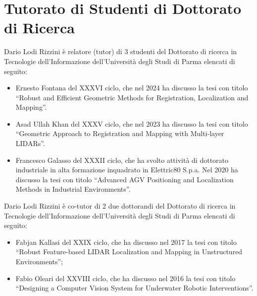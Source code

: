 \documentclass[11pt]{article}
\begin{document}
\section*{Tutorato di Studenti di Dottorato di Ricerca}

Dario Lodi Rizzini \`e relatore (tutor) di 3 studenti del Dottorato di ricerca in Tecnologie dell'Informazione dell'Universit\`a degli Studi di Parma elencati di seguito:
\begin{itemize}
\item Ernesto Fontana del XXXVI ciclo, che nel 2024 ha discusso la tesi con titolo ``Robust and Efficient Geometric Methods for Registration, Localization and Mapping''.
\item Asad Ullah Khan del XXXV ciclo, che nel 2023 ha discusso la tesi con titolo ``Geometric Approach to Registration and Mapping with Multi-layer LIDARs''.
\item Francesco Galasso del XXXII ciclo, che ha svolto attivit\`a di dottorato industriale in alta formazione inquadrato in Elettric80 S.p.a. 
  Nel 2020 ha discusso la tesi con titolo ``Advanced AGV Positioning and Localization Methods in Industrial Environments''.
\end{itemize}
%
\vspace{3mm}
%
Dario Lodi Rizzini \`e co-tutor di 2 due dottorandi del Dottorato di ricerca in Tecnologie dell'Informazione dell'Universit\`a degli Studi di Parma elencati di seguito:
\begin{itemize}
\item Fabjan Kallasi del XXIX ciclo, che ha discusso nel 2017 la tesi con titolo ``Robust Feature-based LIDAR Localization and Mapping in Unstructured Environments'';
\item Fabio Oleari del XXVIII ciclo, che ha discusso nel 2016 la tesi con titolo ``Designing a Computer Vision System for Underwater Robotic Interventions''.
\end{itemize}

\end{document}
